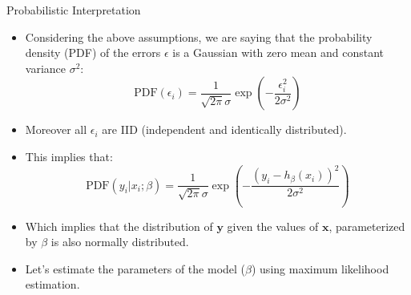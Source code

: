 \documentclass[handout]{beamer}
\begin{document}
\begin{frame}{Probabilistic Interpretation}
\scriptsize{
\begin{itemize}
 \item Considering the above assumptions, we are saying that the probability density (PDF) of the errors $\epsilon$ is a Gaussian with zero mean and constant variance $\sigma^2$:
 \begin{displaymath}
  \text{PDF}(\epsilon_{i})=\frac{1}{\sqrt{2\pi} \sigma} \exp \left(- \frac{\epsilon_{i}^{2}}{2\sigma^2}\right)
 \end{displaymath}
 \item Moreover all $\epsilon_{i}$ are IID (independent and identically distributed).
 \item This implies that:
  \begin{displaymath}
  \text{PDF}(y_i|x_{i};\beta)=\frac{1}{\sqrt{2\pi} \sigma} \exp \left(- \frac{(y_i - h_{\beta}(x_{i}) )^{2}}{2\sigma^2}\right)
 \end{displaymath}
\item Which implies that the distribution of $\mathbf{y}$ given the values of $\mathbf{x}$,  parameterized by $\beta$ is also normally distributed.

\item Let's estimate the parameters of the model  ($\beta$) using maximum likelihood estimation.

\end{itemize}

}
 
\end{frame}
\end{document}
